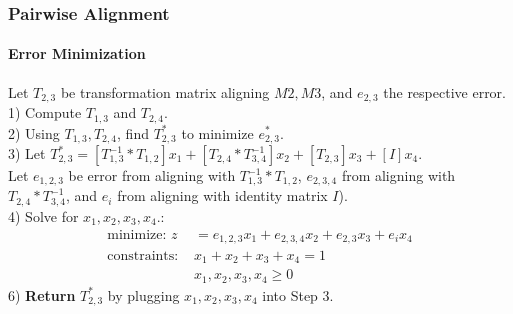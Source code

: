 \documentclass{beamer}
\begin{document}
\begin{frame}
\frametitle{Pairwise Alignment}
\framesubtitle{Error Minimization} 
	\begin{algorithm}
	\DontPrintSemicolon
	Let $T_{2,3}$ be transformation matrix aligning $M2, M3$, and $e_{2,3}$ the respective error.\\
	1) Compute $T_{1,3}$ and $T_{2,4}$.\\
	2) Using $T_{1,3},T_{2,4}$, find $T_{2,3}^{*}$ to minimize $e_{2,3}^{*}$.\\
	3) Let $T_{2,3}^{*} = [T_{1,3}^{-1}*T_{1,2}]x_1 + [T_{2,4}*T_{3,4}^{-1}]x_2 + [T_{2,3}]x_3 + [I]x_4$.\\
	Let $e_{1,2,3}$ be error from aligning with $T_{1,3}^{-1}*T_{1,2}$, $e_{2,3,4}$ from aligning with $T_{2,4}*T_{3,4}^{-1}$, and $e_i$ from aligning with identity matrix $I$). \\
 	4) Solve for $x_1, x_2, x_3, x_4$.:
	\begin{align*}
	 \text{minimize: } z &= e_{1,2,3}x_1 +  e_{2,3,4}x_2 + e_{2,3}x_3 + e_ix_4\\
	 \text{constraints: }&x_1 + x_2 + x_3 + x_4 = 1\\
	 &x_1, x_2, x_3, x_4 \ge 0
	\end{align*}
	6) \textbf{Return} $T_{2,3}^{*}$ by plugging $x_1, x_2, x_3, x_4$ into Step 3. 
	\end{algorithm}
\end{frame}
\end{document}
